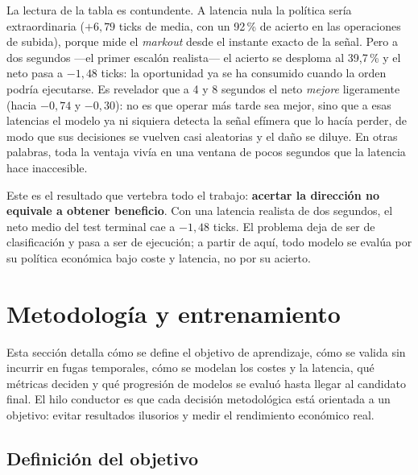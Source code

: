 La lectura de la tabla es contundente. A latencia nula la política sería extraordinaria
($+6{,}79$ ticks de media, con un 92\,\% de acierto en las operaciones de subida), porque mide
el \emph{markout} desde el instante exacto de la señal. Pero a dos segundos —el primer
escalón realista— el acierto se desploma al 39,7\,\% y el neto pasa a $-1{,}48$ ticks: la
oportunidad ya se ha consumido cuando la orden podría ejecutarse. Es revelador que a 4 y 8
segundos el neto \emph{mejore} ligeramente (hacia $-0{,}74$ y $-0{,}30$): no es que operar más
tarde sea mejor, sino que a esas latencias el modelo ya ni siquiera detecta la señal efímera
que lo hacía perder, de modo que sus decisiones se vuelven casi aleatorias y el daño se
diluye. En otras palabras, toda la ventaja vivía en una ventana de pocos segundos que la
latencia hace inaccesible.

Este es el resultado que vertebra todo el trabajo: \textbf{acertar la dirección no equivale
a obtener beneficio}. Con una latencia realista de dos segundos, el neto medio del test
terminal cae a $-1{,}48$ ticks. El problema deja de ser de clasificación y pasa a ser de
ejecución; a partir de aquí, todo modelo se evalúa por su política económica bajo coste y
latencia, no por su acierto.

\section{Metodología y entrenamiento}

Esta sección detalla cómo se define el objetivo de aprendizaje, cómo se valida sin incurrir
en fugas temporales, cómo se modelan los costes y la latencia, qué métricas deciden y qué
progresión de modelos se evaluó hasta llegar al candidato final. El hilo conductor es que
cada decisión metodológica está orientada a un objetivo: evitar resultados ilusorios y medir
el rendimiento económico real.

\subsection{Definición del objetivo}

